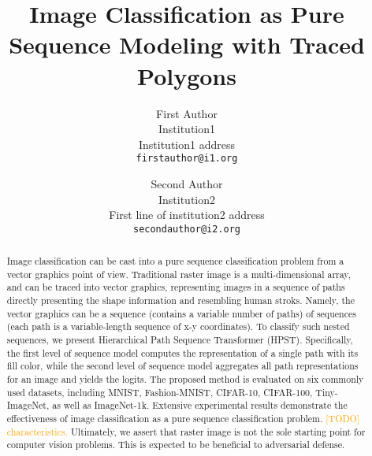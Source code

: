 \documentclass[10pt,twocolumn,letterpaper]{article}
\begin{document}
\title{Image Classification as Pure Sequence Modeling with Traced Polygons}

\author{First Author\\
Institution1\\
Institution1 address\\
{\tt\small firstauthor@i1.org}
\and
Second Author\\
Institution2\\
First line of institution2 address\\
{\tt\small secondauthor@i2.org}
}
\maketitle

\begin{abstract}
    Image classification can be cast into a pure sequence classification
    problem from a vector graphics point of view.
    Traditional raster image is a multi-dimensional array, and
    can be traced into vector graphics, representing
    images in a sequence of paths directly presenting the shape information
    and resembling human stroks.
    Namely, the vector graphics can be a sequence (contains a
    variable number of paths) of sequences (each path is a variable-length
    sequence of x-y coordinates).
    To classify such nested sequences, we present Hierarchical Path Sequence
    Transformer (HPST).
    Specifically, the first level of sequence model computes the representation
    of a single path with its fill color, while the second level of sequence
    model aggregates all path representations for an image and yields
    the logits.
    The proposed method is evaluated on six commonly used datasets, including
    MNIST, Fashion-MNIST, CIFAR-10, CIFAR-100, Tiny-ImageNet, as well as ImageNet-1k.
    Extensive experimental results demonstrate the effectiveness of image
    classification as a pure sequence classification problem.
    \textcolor{orange}{[TODO] characteristics.}
    Ultimately, we assert that raster image is not the sole starting point
    for computer vision problems.
    This is expected to be beneficial to adversarial defense.
\end{abstract}
\end{document}

